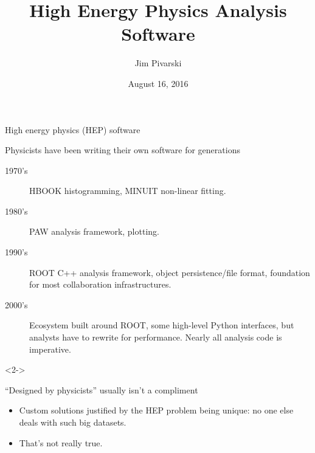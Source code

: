 \documentclass{beamer}
\title[2016-08-16-ROOT-to-Arrow]{High Energy Physics Analysis Software}
\author{Jim Pivarski}
\institute{Princeton University -- DIANA}
\date{August 16, 2016}
\begin{document}

\begin{frame}
  \titlepage
\end{frame}



\begin{frame}{High energy physics (HEP) software}
\vspace{0.25 cm}

\begin{block}{Physicists have been writing their own software for generations}
\begin{description}
\item[1970's] HBOOK histogramming, MINUIT non-linear fitting.
\item[1980's] PAW analysis framework, plotting.
\item[1990's] ROOT C++ analysis framework, object persistence/file format, foundation for most collaboration infrastructures.
\item[2000's] Ecosystem built around ROOT, some high-level Python interfaces, but analysts have to rewrite for performance. Nearly all analysis code is imperative.
\end{description}
\end{block}

\begin{uncoverenv}<2->
\begin{block}{``Designed by physicists'' usually isn't a compliment}
\begin{itemize}
\item Custom solutions justified by the HEP problem being unique: no one else deals with such big datasets.
\item That's not really true.
\end{itemize}
\end{block}
\end{uncoverenv}
\end{frame}
\end{document}
